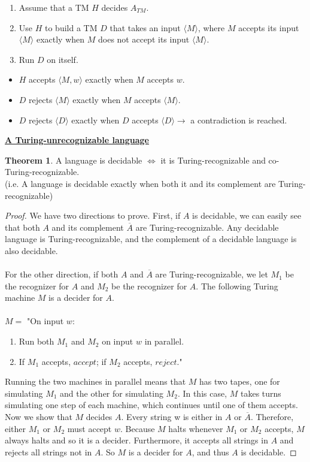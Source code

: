 \documentclass[11pt]{article}
\theoremstyle{definition}
\newtheorem{thm}{Theorem}[section]
\begin{document}
\begin{enumerate}[leftmargin=*]
    \item Assume that a TM $H$ decides $A_{TM}$.
    \item Use $H$ to build a TM $D$ that takes an input $\langle M\rangle$, where $M$ accepts its input $\langle M\rangle$ exactly when $M$ does not accept its input $\langle M\rangle$.
    \item Run $D$ on itself. 
\end{enumerate}
\begin{itemize}
    \item $H$ accepts $\langle M, w\rangle$ exactly when $M$ accepts $w$.
    \item $D$ rejects $\langle M\rangle$ exactly when $M$ accepts $\langle M\rangle$.
    \item $D$ rejects $\langle D\rangle$ exactly when $D$ accepts $\langle D\rangle\to$ a contradiction is reached. 
\end{itemize}

\textbf{\underline{A Turing-unrecognizable language}}
\begin{thm}
    A language is decidable $\iff$ it is Turing-recognizable and co-Turing-recognizable.\\
    (i.e. A language is decidable exactly when both it and its complement are Turing-recognizable)
\end{thm}
\begin{proof}
    We have two directions to prove. First, if $A$ is decidable, we can easily see that both $A$ and its complement $\overline{A}$ are Turing-recognizable. Any decidable language is Turing-recognizable, and the complement of a decidable language is also decidable.\\\\
    For the other direction, if both $A$ and $\overline{A}$ are Turing-recognizable, we let $M_1$ be the recognizer for $A$ and $M_2$ be the recognizer for $A$. The following Turing machine $M$ is a decider for $A$.\\\\
    $M=$ "On input $w$:
    \begin{enumerate}
        \item Run both $M_1$ and $M_2$ on input $w$ in parallel.
        \item If $M_1$ accepts, $accept$; if $M_2$ accepts, $reject$."
    \end{enumerate}
Running the two machines in parallel means that $M$ has two tapes, one for simulating $M_1$ and the other for simulating $M_2$. In this case, $M$ takes turns simulating one step of each machine, which continues until one of them accepts.\\
Now we show that $M$ decides $A$. Every string w is either in $A$ or $\overline{A}$. Therefore, either $M_1$ or $M_2$ must accept $w$. Because $M$ halts whenever $M_1$ or $M_2$ accepts, $M$ always halts and so it is a decider. Furthermore, it accepts all strings in $A$ and rejects all strings not in $A$. So $M$ is a decider for $A$, and thus $A$ is decidable.
\end{proof}
\end{document}
